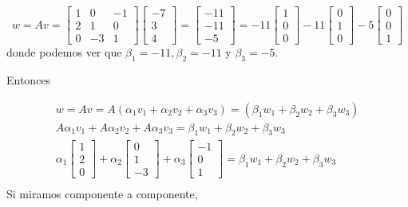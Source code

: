 \begin{equation*}
w = A v =  \left[ \begin{array}{ccc}
    1 & 0 & -1\\
    2 & 1 & 0\\
    0 & -3 & 1
\end{array}
\right] \left[ \begin{array}{c}
    -7 \\
    3 \\
    4 
\end{array}
\right] = \left[ \begin{array}{c}
    -11 \\
    -11 \\
    -5 
\end{array}
\right] =  -11 \left[ \begin{array}{c}
    1 \\
    0 \\
    0 
\end{array}
\right] -11 \left[ \begin{array}{c}
    0 \\
    1 \\
    0 
\end{array}
\right] - 5 \left[ \begin{array}{c}
    0 \\
    0 \\
    1 
\end{array}
\right]
\end{equation*}
donde podemos ver que  $\beta_1 = -11, \beta_2 = -11 $ y  $\beta_3 = -5$.

Entonces

\begin{eqnarray*}
w = Av = A(\alpha_1 v_1 + \alpha_2 v_2 + \alpha_3 v_3) = (\beta_1 w_1 + \beta_2 w_2 + \beta_3 w_3) \\
A\alpha_1 v_1 + A\alpha_2 v_2 + A\alpha_3 v_3 = \beta_1 w_1 + \beta_2 w_2 + \beta_3 w_3 \\
\alpha_1 \left[ \begin{array}{c}
    1 \\
    2 \\
    0 
\end{array}
\right] + \alpha_2 \left[ \begin{array}{c}
    0 \\
    1 \\
    -3 
\end{array}
\right] + \alpha_3 \left[ \begin{array}{c}
    -1 \\
    0 \\
    1 
\end{array}
\right] =  \beta_1 w_1 + \beta_2 w_2 + \beta_3 w_3 \\
\end{eqnarray*}
Si miramos componente a componente,

